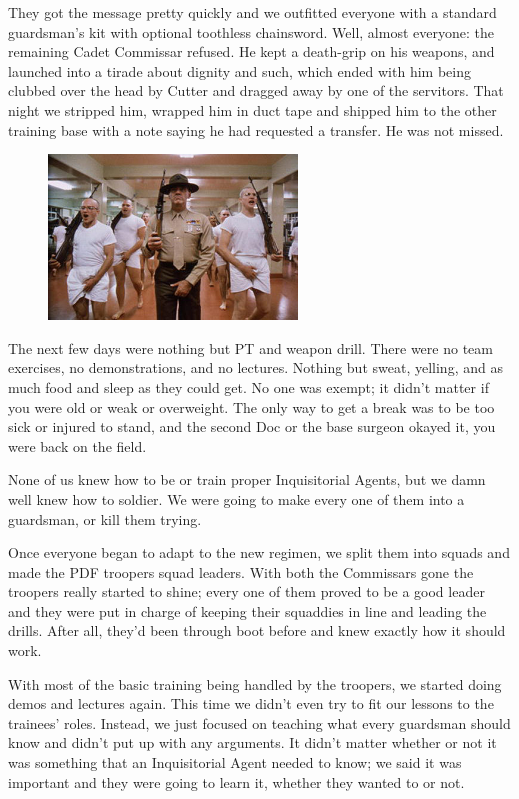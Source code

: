 They got the message pretty quickly and we outfitted everyone with a standard guardsman’s kit with optional toothless chainsword. 
Well, almost everyone: 
the remaining Cadet Commissar refused. 
He kept a death-grip on his weapons, and launched into a tirade about dignity and such, which ended with him being clubbed over the head by Cutter and dragged away by one of the servitors. 
That night we stripped him, wrapped him in duct tape and shipped him to the other training base with a note saying he had requested a transfer. 
He was not missed.

\begin{figure}
	\begin{center}
		\includegraphics[width=\figwidth]{pics/8/23.png}
	\end{center}
\end{figure}
The next few days were nothing but PT and weapon drill. 
There were no team exercises, no demonstrations, and no lectures. 
Nothing but sweat, yelling, and as much food and sleep as they could get. 
No one was exempt; 
it didn’t matter if you were old or weak or overweight. 
The only way to get a break was to be too sick or injured to stand, and the second Doc or the base surgeon okayed it, you were back on the field. 


None of us knew how to be or train proper Inquisitorial Agents, but we damn well knew how to soldier. 
We were going to make every one of them into a guardsman, or kill them trying.

Once everyone began to adapt to the new regimen, we split them into squads and made the PDF troopers squad leaders. 
With both the Commissars gone the troopers really started to shine; 
every one of them proved to be a good leader and they were put in charge of keeping their squaddies in line and leading the drills. 
After all, they’d been through boot before and knew exactly how it should work.

With most of the basic training being handled by the troopers, we started doing demos and lectures again. 
This time we didn’t even try to fit our lessons to the trainees’ roles. 
Instead, we just focused on teaching what every guardsman should know and didn’t put up with any arguments. 
It didn’t matter whether or not it was something that an Inquisitorial Agent needed to know; 
we said it was important and they were going to learn it, whether they wanted to or not.

